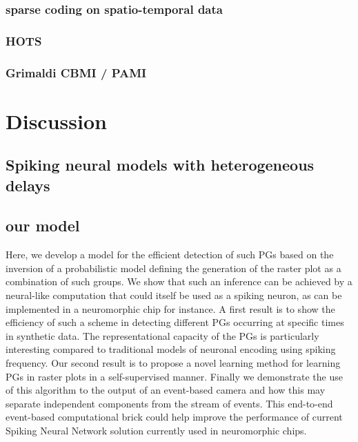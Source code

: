 \documentclass[brainsci, %
               review,submit,pdftex,moreauthors%
               ]{Definitions/mdpi}
\begin{document}
\subsubsection{sparse coding on spatio-temporal data}\label{sparse-coding-on-spatio-temporal-data}
\subsubsection{HOTS}\label{hots}
\subsubsection{Grimaldi CBMI / PAMI}\label{grimaldi-cbmi-pami}
\section{Discussion}\label{discussion}
\subsection{Spiking neural models with heterogeneous delays}
\subsection{our model}\label{our-model}
Here, we develop a model for the efficient detection of such PGs based on the inversion of a probabilistic model defining the generation of the raster plot as a combination of such groups. We show that such an inference can be achieved by a neural-like computation that could itself be used as a spiking neuron, as can be implemented in a neuromorphic chip for instance. A first result is to show the efficiency of such a scheme in detecting different PGs occurring at specific times in synthetic data. The representational capacity of the PGs is particularly interesting compared to traditional models of neuronal encoding using spiking frequency. Our second result is to propose a novel learning method for learning PGs in raster plots in a self-supervised manner. Finally we demonstrate the use of this algorithm to the output of an event-based camera and how this may separate independent components from the stream of events. This end-to-end event-based computational brick could help improve the performance of current Spiking Neural Network solution currently used in neuromorphic chips.
\end{document}
